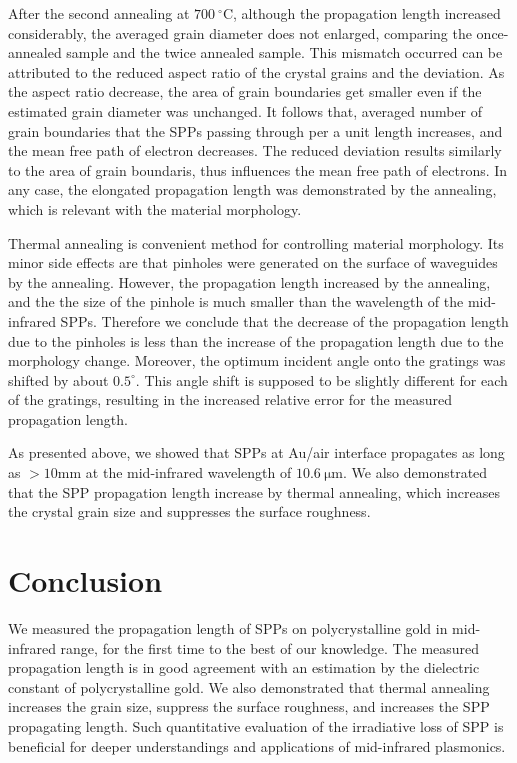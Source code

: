 \documentclass[twocolumn,10.5pt,a4]{article}
\begin{document}
After the second annealing at $700\:^\circ\mathrm{C}$, although the propagation length increased considerably, the averaged grain diameter does not enlarged, comparing the once-annealed sample and the twice annealed sample. 
This mismatch occurred can be attributed to the reduced aspect ratio of the crystal grains and the deviation. As the aspect ratio decrease, the area of grain boundaries get smaller even if the estimated grain diameter was unchanged. It follows that, averaged number of grain boundaries that the SPPs passing through per a unit length increases, and the mean free path of electron decreases. The reduced deviation results similarly to the area of grain boundaris, thus influences the mean free path of electrons.
In any case, the elongated propagation length was demonstrated by the annealing, which is relevant with the material morphology.

Thermal annealing is convenient method for controlling material morphology\cite{Nogues}. Its minor side effects are that pinholes were generated on the surface of waveguides by the annealing. However, the propagation length increased by the annealing, and the the size of the pinhole is much smaller than the wavelength of the mid-infrared SPPs. Therefore we conclude that the decrease of the propagation length due to the pinholes is less than the increase of the propagation length due to the morphology change. 
Moreover, the optimum incident angle onto the gratings was shifted by about $0.5^\circ$. This angle shift is supposed to be slightly different for each of the gratings, resulting in the increased relative error for the measured propagation length.

As presented above, we showed that SPPs at Au/air interface propagates as long as $>10\mathrm{mm}$ at the mid-infrared wavelength of $10.6\:\mathrm{\mu m}$.
We also demonstrated that the SPP propagation length increase by thermal annealing, which increases the crystal grain size and suppresses the surface roughness.

\section{Conclusion}
\label{sec:conclusion}
We measured the propagation length of SPPs on polycrystalline gold in mid-infrared range, for the first time to the best of our knowledge. 
The measured propagation length is in good agreement with an estimation by the dielectric constant of polycrystalline gold.
We also demonstrated that thermal annealing increases the grain size, suppress the surface roughness, and increases the SPP propagating length. 
Such quantitative evaluation of the irradiative loss of SPP is beneficial for deeper understandings and applications of mid-infrared plasmonics.
\end{document}
